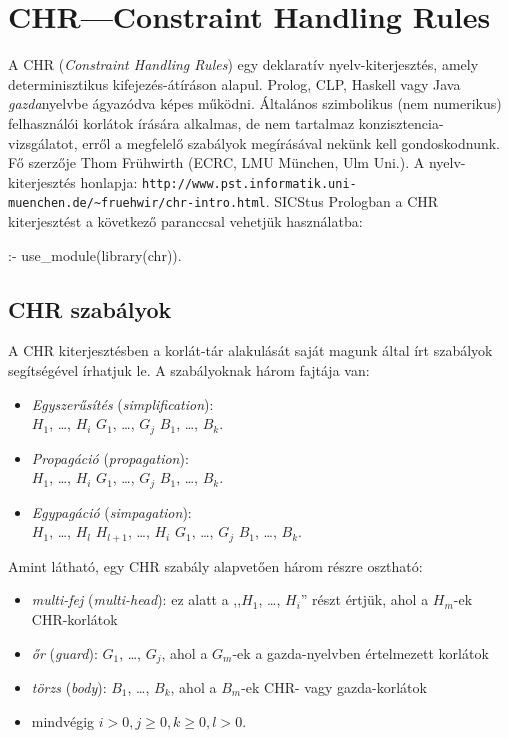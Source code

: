 \clearpage

\chapter{CHR---Constraint Handling Rules\kieg}

A CHR (\emph{Constraint Handling Rules}) egy deklaratív nyelv-kiterjesztés,
amely determinisztikus kifejezés-átíráson alapul. Prolog, CLP, Haskell
vagy Java \emph{gazda}nyelvbe ágyazódva képes működni. Általános szimbolikus
(nem numerikus) felhasználói korlátok írására alkalmas, de nem tartalmaz
konzisztencia-vizsgálatot, erről a megfelelő szabályok megírásával
nekünk kell gondoskodnunk. Fő szerzője Thom Frühwirth (ECRC, LMU München, Ulm Uni.).
\br
A nyelv-kiterjesztés honlapja:
\verb'http://www.pst.informatik.uni-muenchen.de/~fruehwir/chr-intro.html'.
\br
SICStus Prologban a CHR kiterjesztést a következő paranccsal vehetjük használatba:
\begin{prologcode}
:- use_module(library(chr)).
\end{prologcode}

\section{CHR szabályok}

A CHR kiterjesztésben a korlát-tár alakulását saját magunk által írt szabályok
segítségével írhatjuk le. A szabályoknak három fajtája van:

\begin{itemize}
\item \emph{Egyszerűsítés} (\emph{simplification}):\\
 $H_1$, \ldots, $H_i$ \cd{<=>} $G_1$, \ldots, $G_j$ \cd{|} $B_1$,
 \ldots, $B_k$.
\item \emph{Propagáció} (\emph{propagation}):\\
 $H_1$, \ldots, $H_i$ \cd{==>} $G_1$, \ldots, $G_j$ \cd{|} $B_1$,
 \ldots, $B_k$. 
\item \emph{Egypagáció} (\emph{simpagation}):\\
 $H_1$, \ldots, $H_l$ \cd{\bs} $H_{l+1}$, \ldots, $H_i$ \cd{==>} $G_1$, \ldots, $G_j$ \cd{|} $B_1$,
 \ldots, $B_k$. 
\end{itemize}

Amint látható, egy CHR szabály alapvetően három részre osztható:

\begin{itemize}
\item \emph{multi-fej} (\emph{multi-head}): ez alatt a ,,$H_1$, \ldots, $H_i$'' részt
értjük, ahol a $H_m$-ek CHR-korlátok
\item \emph{őr} (\emph{guard}): $G_1$, \ldots, $G_j$, ahol a $G_m$-ek a gazda-nyelvben
értelmezett korlátok
\item \emph{törzs} (\emph{body}): $B_1$, \ldots, $B_k$, ahol a $B_m$-ek CHR- vagy
gazda-korlátok
\item mindvégig $i > 0, j \geq 0, k \geq 0, l > 0$.
\end{itemize}

